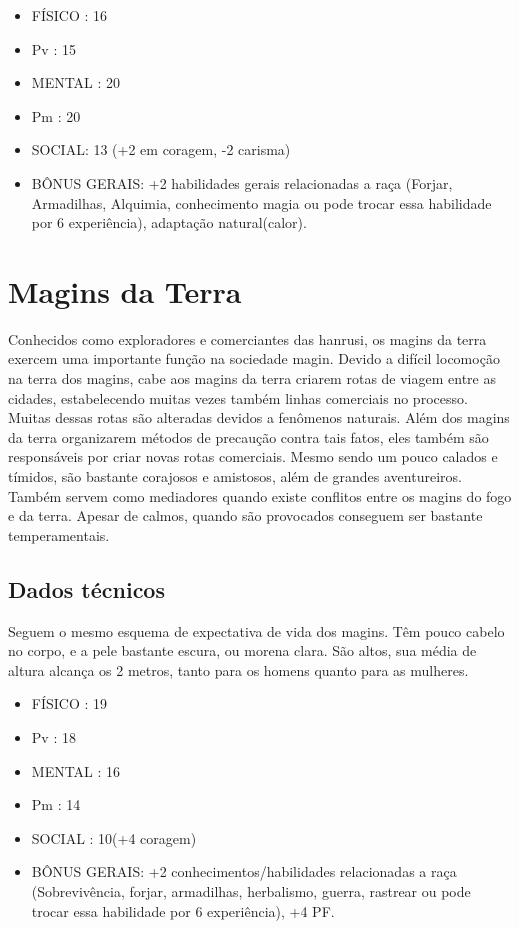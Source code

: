 \begin{itemize}


\item FÍSICO : 16
\item Pv : 15 

\item MENTAL : 20
\item Pm : 20

\item SOCIAL: 13 (+2 em coragem, -2 carisma)

\item BÔNUS GERAIS: +2 habilidades gerais relacionadas a raça (Forjar, Armadilhas, Alquimia, conhecimento magia ou pode trocar essa habilidade por 6 experiência), adaptação natural(calor).


\end{itemize}


\section{Magins da Terra}

Conhecidos como exploradores e comerciantes das hanrusi, os magins da terra exercem uma importante função na sociedade magin. Devido a difícil locomoção na terra dos magins, cabe aos magins da terra criarem rotas de viagem entre as cidades, estabelecendo muitas vezes também linhas comerciais no processo. Muitas dessas rotas são alteradas devidos a fenômenos naturais. Além dos magins da terra organizarem métodos de precaução contra tais fatos, eles também são responsáveis por criar novas rotas comerciais. Mesmo sendo um pouco calados e tímidos, são bastante corajosos e amistosos, além de grandes aventureiros. Também servem como mediadores quando existe conflitos entre os magins do fogo e da terra. Apesar de calmos, quando são provocados conseguem ser bastante temperamentais.

\subsection{Dados técnicos}


Seguem o mesmo esquema de expectativa de vida dos magins. Têm pouco cabelo no corpo, e a pele bastante escura, ou morena clara. São altos, sua média de altura alcança os 2 metros, tanto para os homens quanto para as mulheres. 



\begin{itemize}


\item FÍSICO : 19
\item Pv : 18 

\item MENTAL : 16
\item Pm : 14

\item SOCIAL : 10(+4 coragem)

\item BÔNUS GERAIS: +2 conhecimentos/habilidades relacionadas a raça (Sobrevivência, forjar, armadilhas, herbalismo, guerra, rastrear ou pode trocar essa habilidade por 6 experiência), +4 PF. 


\end{itemize}

